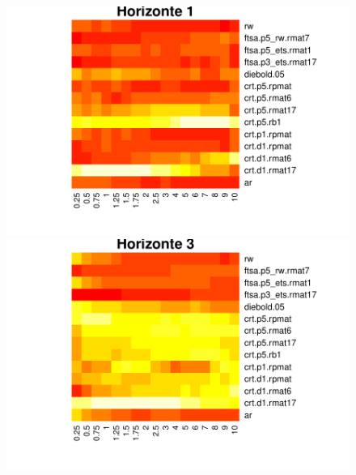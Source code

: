 \documentclass[
	12pt,				%
	openright,			%
	oneside,			%
	a4paper,			%
	english,			%
	brazil				%
	]{dissertacao-ufrgs-abntex2}
\begin{document}
\begin{figure}[htp]
  \centering
  \begin{minipage}[t]{0.45\linewidth}
    \centering
    \begin{minipage}[t]{\linewidth}
      \centering     \includegraphics[width=\textwidth]{anexos/heatmap1.pdf}
    \end{minipage}
    \begin{minipage}[b]{\linewidth}
      \centering     \includegraphics[width=\textwidth]{anexos/heatmap3.pdf} 
    \end{minipage}
  \end{minipage}
  \begin{minipage}[t]{0.45\linewidth}
    \centering
    \begin{minipage}[t]{\linewidth}

\end{minipage}
\end{minipage}
\end{figure}
\end{document}
